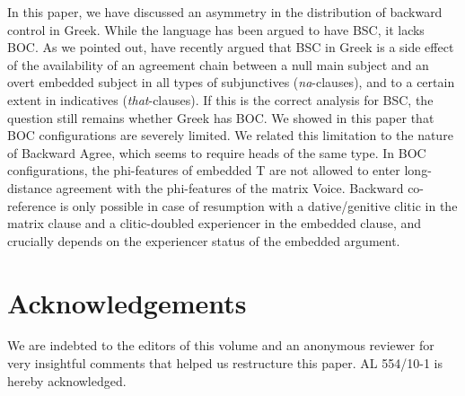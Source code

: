 \documentclass[output=paper]{langsci/langscibook}
\begin{document}
In this paper, we have discussed an asymmetry in the distribution of backward control in Greek. While the language has been argued to have BSC, it lacks BOC. As we pointed out, \citet{Tsakali2017} have recently argued that BSC in Greek is a side effect of the availability of an agreement chain between a null main subject and an overt embedded subject in all types of subjunctives (\textit{na}{}-clauses), and to a certain extent in indicatives (\textit{that}{}-clauses). If this is the correct analysis for BSC, the question still remains whether Greek has BOC. We showed in this paper that BOC configurations are severely limited. We related this limitation to the nature of Backward Agree, which seems to require heads of the same type. In BOC configurations, the phi-features of embedded T are not allowed to enter long-distance agreement with the phi-features of the matrix Voice. Backward co-reference is only possible in case of resumption with a dative\slash genitive clitic in the matrix clause and a clitic-doubled experiencer in the embedded clause, and crucially depends on the experiencer status of the embedded argument.

\section*{Acknowledgements}

We are indebted to the editors of this volume and an anonymous reviewer for very insightful comments that helped us restructure this paper. AL 554\slash 10-1 is hereby acknowledged.
\end{document}
